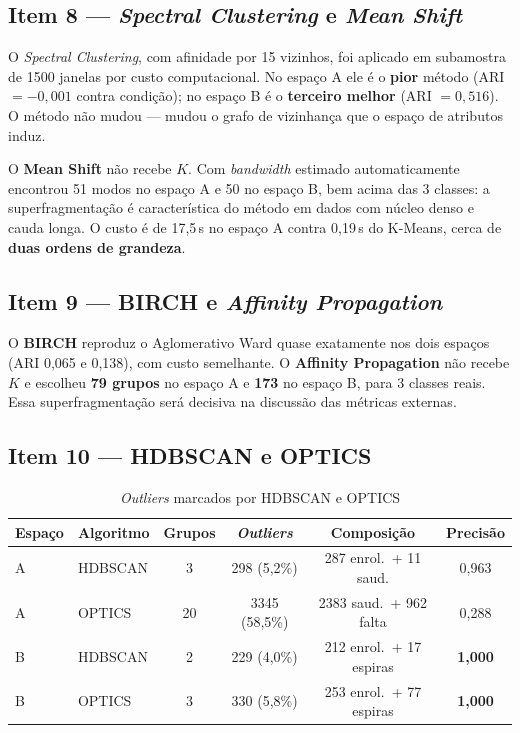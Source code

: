 \documentclass[12pt,a4paper]{article}
\begin{document}
\subsection{Item 8 --- \emph{Spectral Clustering} e \emph{Mean Shift}}

O \emph{Spectral Clustering}, com afinidade por 15 vizinhos, foi aplicado em subamostra de 1500 janelas por custo computacional. No espaço A ele é o \textbf{pior} método (ARI $= -0{,}001$ contra condição); no espaço B é o \textbf{terceiro melhor} (ARI $= 0{,}516$). O método não mudou --- mudou o grafo de vizinhança que o espaço de atributos induz.

O \textbf{Mean Shift} não recebe $K$. Com \emph{bandwidth} estimado automaticamente encontrou 51 modos no espaço A e 50 no espaço B, bem acima das 3 classes: a superfragmentação é característica do método em dados com núcleo denso e cauda longa. O custo é de 17,5\,s no espaço A contra 0,19\,s do K-Means, cerca de \textbf{duas ordens de grandeza}.

\subsection{Item 9 --- BIRCH e \emph{Affinity Propagation}}

O \textbf{BIRCH} reproduz o Aglomerativo Ward quase exatamente nos dois espaços (ARI 0,065 e 0,138), com custo semelhante. O \textbf{Affinity Propagation} não recebe $K$ e escolheu \textbf{79 grupos} no espaço A e \textbf{173} no espaço B, para 3 classes reais. Essa superfragmentação será decisiva na discussão das métricas externas.

\subsection{Item 10 --- HDBSCAN e OPTICS}
\label{sec:hdbscan}

\begin{table}[H]
\centering
\caption{\emph{Outliers} marcados por HDBSCAN e OPTICS}
\label{tab:outliers}
\begin{tabular}{llcccc}
\toprule
Espaço & Algoritmo & Grupos & \emph{Outliers} & Composição & Precisão \\
\midrule
A & HDBSCAN & 3  & 298 (5,2\%)   & 287 enrol.\ + 11 saud. & 0,963 \\
A & OPTICS  & 20 & 3345 (58,5\%) & 2383 saud.\ + 962 falta & 0,288 \\
B & HDBSCAN & 2  & 229 (4,0\%)   & 212 enrol.\ + 17 espiras & \textbf{1,000} \\
B & OPTICS  & 3  & 330 (5,8\%)   & 253 enrol.\ + 77 espiras & \textbf{1,000} \\
\bottomrule
\end{tabular}
\end{table}
\end{document}
